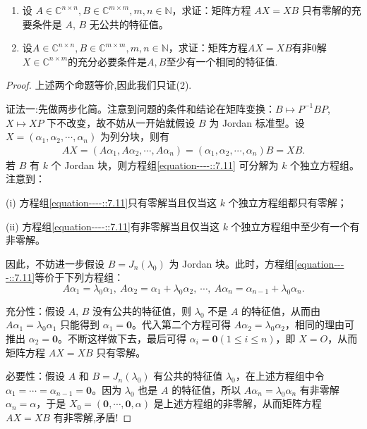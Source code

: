 \documentclass[../../main.tex]{subfiles}
\begin{document}
\begin{proposition}[$AX=BX$经典结论]\label{proposition:AX-XB线性映射相关等价条件--(1)}
\begin{enumerate}[(1)]
\item 设 $A\in\mathbb{C}^{n\times n}, B\in\mathbb{C}^{m\times m}, m,n\in\mathbb{N}$，求证：矩阵方程 $AX = XB$ 只有零解的充要条件是 $A$, $B$ 无公共的特征值。

\item 设$A\in\mathbb{C}^{n\times n}, B\in\mathbb{C}^{m\times m}, m,n\in\mathbb{N}$，求证：矩阵方程$AX = XB$有非$0$解$X\in\mathbb{C}^{n\times m}$的充分必要条件是$A,B$至少有一个相同的特征值. 
\end{enumerate}
\end{proposition}
\begin{proof}
上述两个命题等价,因此我们只证(2).

{\color{blue} 证法一:}先做两步化简。注意到问题的条件和结论在矩阵变换：$B \mapsto P^{-1}BP$, $X \mapsto XP$ 下不改变，故不妨从一开始就假设 $B$ 为 Jordan 标准型。设 $X = (\alpha_1, \alpha_2, \cdots, \alpha_n)$ 为列分块，则有
\begin{align}
AX = (A\alpha_1, A\alpha_2, \cdots, A\alpha_n) = (\alpha_1, \alpha_2, \cdots, \alpha_n)B = XB. \label{equation----::7.11}
\end{align}
若 $B$ 有 $k$ 个 Jordan 块，则方程组\eqref{equation----::7.11} 可分解为 $k$ 个独立方程组。注意到：

(i) 方程组\eqref{equation----::7.11}只有零解当且仅当这 $k$ 个独立方程组都只有零解；

(ii) 方程组\eqref{equation----::7.11}有非零解当且仅当这 $k$ 个独立方程组中至少有一个有非零解。

因此，不妨进一步假设 $B = J_n(\lambda_0)$ 为 Jordan 块。此时，方程组\eqref{equation----::7.11}等价于下列方程组：
\[
A\alpha_1 = \lambda_0\alpha_1,~ A\alpha_2 = \alpha_1 + \lambda_0\alpha_2,~ \cdots,~ A\alpha_n = \alpha_{n - 1} + \lambda_0\alpha_n.
\]

{\heiti 充分性：}假设 $A$, $B$ 没有公共的特征值，则 $\lambda_0$ 不是 $A$ 的特征值，从而由 $A\alpha_1 = \lambda_0\alpha_1$ 只能得到 $\alpha_1 = \mathbf{0}$。代入第二个方程可得 $A\alpha_2 = \lambda_0\alpha_2$，相同的理由可推出 $\alpha_2 = \mathbf{0}$。不断这样做下去，最后可得 $\alpha_i = \mathbf{0} (1 \leqslant  i \leqslant  n)$，即 $X = O$，从而矩阵方程 $AX = XB$ 只有零解。

{\heiti 必要性：}假设 $A$ 和 $B = J_n(\lambda_0)$ 有公共的特征值 $\lambda_0$，在上述方程组中令 $\alpha_1 = \cdots = \alpha_{n - 1} = \mathbf{0}$。因为 $\lambda_0$ 也是 $A$ 的特征值，所以 $A\alpha_n = \lambda_0\alpha_n$ 有非零解 $\alpha_n = \alpha$，于是 $X_0 = (\mathbf{0}, \cdots, \mathbf{0}, \alpha)$ 是上述方程组的非零解，从而矩阵方程 $AX = XB$ 有非零解,矛盾!


\end{proof}
\end{document}
